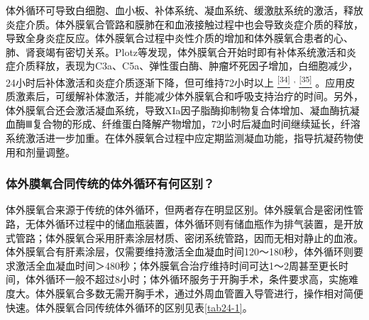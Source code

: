 体外循环可导致白细胞、血小板、补体系统、凝血系统、缓激肽系统的激活，释放炎症介质。体外膜氧合管路和膜肺在和血液接触过程中也会导致炎症介质的释放，导致全身炎症反应。体外膜氧合过程中炎性介质的增加和体外膜氧合患者的心、肺、肾衰竭有密切关系。Plotz等发现，体外膜氧合开始时即有补体系统激活和炎症介质释放，表现为C3a、C5a、弹性蛋白酶、肿瘤坏死因子增加，白细胞减少，24小时后补体激活和炎症介质逐渐下降，但可维持72小时以上
\protect\hyperlink{text00030.htmlux5cux23ch34-29}{\textsuperscript{{[}34{]}}}
\textsuperscript{,}
\protect\hyperlink{text00030.htmlux5cux23ch35-29}{\textsuperscript{{[}35{]}}}
。应用皮质激素后，可缓解补体激活，并能减少体外膜氧合和呼吸支持治疗的时间。另外，体外膜氧合还会激活凝血系统，导致XIa因子脂酶抑制物复合体增加、凝血酶抗凝血酶Ⅲ复合物的形成、纤维蛋白降解产物增加，72小时后凝血时间继续延长，纤溶系统激活进一步加重。在体外膜氧合过程中应定期监测凝血功能，指导抗凝药物使用和剂量调整。

\subsubsection{体外膜氧合同传统的体外循环有何区别？}

体外膜氧合来源于传统的体外循环，但两者存在明显区别。体外膜氧合是密闭性管路，无体外循环过程中的储血瓶装置，体外循环则有储血瓶作为排气装置，是开放式管路；体外膜氧合采用肝素涂层材质、密闭系统管路，因而无相对静止的血液。体外膜氧合有肝素涂层，仅需要维持激活全血凝血时间120～180秒，体外循环则要求激活全血凝血时间＞480秒；体外膜氧合治疗维持时间可达1～2周甚至更长时间，体外循环一般不超过8小时；体外循环服务于开胸手术，条件要求高，实施难度大。体外膜氧合多数无需开胸手术，通过外周血管置入导管进行，操作相对简便快速。体外膜氧合同传统体外循环的区别见表\ref{tab24-1}。

